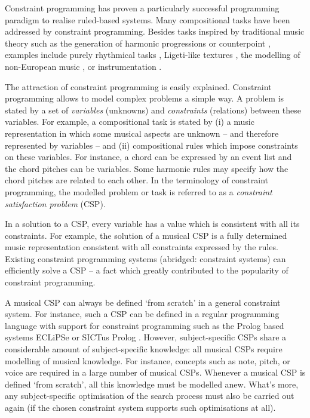 \documentclass{scrartcl}
\begin{document}
Constraint programming has proven a particularly successful programming paradigm to realise ruled-based systems. Many compositional tasks have been addressed by constraint programming. Besides tasks inspired by traditional music theory such as the generation of harmonic progressions \citep{Pachet:Roy:2000} or counterpoint \citep{Schottstaedt:Counterpoint:1989,Laurson:PhD:1996}, examples include purely rhythmical tasks \citep{Sandred:PRISMA01:2003}, Ligeti-like textures \citep{Laurson:2001}, the modelling of non-European music \citep{Chemillier:Truchet:2001}, or instrumentation \citep{Laurson:2001}.


The attraction of constraint programming is easily explained. Constraint programming allows to model complex problems a simple way. 
A problem is stated by a set of \emph{variables} (unknowns) and \emph{constraints} (relations) between these variables. 
For example, a compositional task is stated by (i) a music representation in which some musical aspects are unknown -- and therefore represented by variables -- and (ii) compositional rules which impose constraints on these variables. For instance, a chord can be expressed by an event list and the chord pitches can be variables. Some harmonic rules may specify how the chord pitches are related to each other. 
In the terminology of constraint programming, the modelled problem or task is referred to as a \emph{constraint satisfaction problem} (CSP). 


In a solution to a CSP, every variable has a value which is consistent with all its constraints.
For example, the solution of a musical CSP is a fully determined music representation consistent with all constraints expressed by the rules.
Existing constraint programming systems (abridged: constraint systems) can efficiently solve a CSP -- a fact which greatly contributed to the popularity of constraint programming.


A musical CSP can always be defined `from scratch' in a general constraint system. For instance, such a CSP can be defined in a regular programming language with support for constraint programming such as the Prolog based systems ECLiPSe \citep{CheadleEtAl:ECLiPSeIntro:2003} or SICTus Prolog . However, subject-specific CSPs share a considerable amount of subject-specific knowledge: all musical CSPs require modelling of musical knowledge. For instance, concepts such as note, pitch, or voice are required in a large number of musical CSPs. 
Whenever a musical CSP is defined `from scratch', all this knowledge must be modelled anew. What's more, any subject-specific optimisation of the search process must also be carried out again (if the chosen constraint system supports such optimisations at all).
\end{document}
